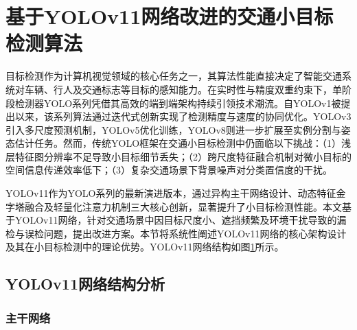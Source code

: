 \section{基于YOLOv11网络改进的交通小目标检测算法\label{方法B}}

目标检测作为计算机视觉领域的核心任务之一，其算法性能直接决定了智能交通系统对车辆、行人及交通标志等目标的感知能力。在实时性与精度双重约束下，单阶段检测器YOLO\cite{yolov1, yolov2, yolov3, yolov4, yolov6, yolov7, yolov9, yolov10, yolov11}系列凭借其高效的端到端架构持续引领技术潮流。自YOLOv1被提出以来，该系列算法通过迭代式创新实现了检测精度与速度的协同优化。YOLOv3引入多尺度预测机制，YOLOv5优化训练，YOLOv8则进一步扩展至实例分割与姿态估计任务。然而，传统YOLO框架在交通小目标检测中仍面临以下挑战：（1）浅层特征图分辨率不足导致小目标细节丢失；（2）跨尺度特征融合机制对微小目标的空间信息传递效率低下；（3）复杂交通场景下背景噪声对分类置信度的干扰。

YOLOv11作为YOLO系列的最新演进版本，通过异构主干网络设计、动态特征金字塔融合及轻量化注意力机制三大核心创新，显著提升了小目标检测性能。本文基于YOLOv11网络，针对交通场景中因目标尺度小、遮挡频繁及环境干扰导致的漏检与误检问题，提出改进方案。本节将系统性阐述YOLOv11网络的核心架构设计及其在小目标检测中的理论优势。YOLOv11网络结构如图\ref{fig:YOLOv11}所示。

\subsection{YOLOv11网络结构分析}

\begin{figure}[htb]
    \centering
    \captionsetup{font=footnotesize}
    \label{fig:YOLOv11}
\end{figure}

\subsubsection{主干网络}

